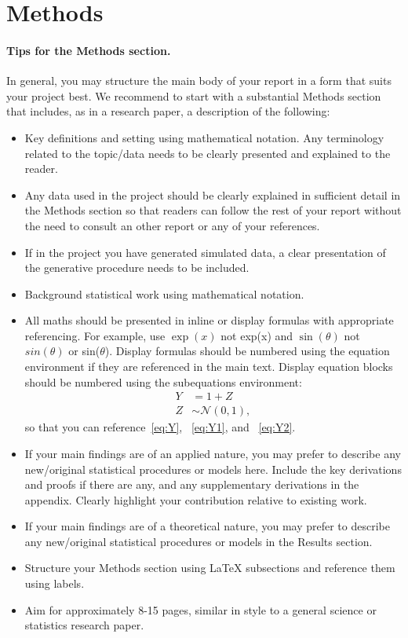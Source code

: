\section{Methods}\label{sec:methods}

\paragraph{Tips for the Methods section.} In general, you may structure the main body of your report in a form that suits your project best. We recommend to start with a substantial Methods section that includes, as in a research paper, a description of the following:
\begin{itemize}
    \item Key definitions and setting using mathematical notation. Any terminology related to the topic/data needs to be clearly presented and explained to the reader.
    \item Any data used in the project should be clearly explained in sufficient detail in the Methods section so that readers can follow the rest of your report without the need to consult an other report or any of your references.
    \item If in the project you have generated simulated data, a clear presentation of the generative procedure needs to be included. 
    \item Background statistical work using mathematical notation.
    \item All maths should be presented in inline or display formulas with appropriate referencing. For example, use $\exp(x)$ not exp(x) and $\sin(\theta)$ not $sin(\theta)$ or sin($\theta$). Display formulas should be numbered using the equation environment if they are referenced in the main text. Display equation blocks should be numbered using the subequations environment:
\begin{subequations}\label{eq:Y}
    \begin{align}
        Y & = 1 + Z \label{eq:Y1} \\ 
        Z & \sim \mathcal{N}(0,1) \label{eq:Y2},
    \end{align}
\end{subequations}
    so that you can reference~\eqref{eq:Y}, ~\eqref{eq:Y1}, and ~\eqref{eq:Y2}.
    \item If your main findings are of an applied nature, you may prefer to describe any new/original statistical procedures or models here. Include the key derivations and proofs if there are any, and any supplementary derivations in the appendix. Clearly highlight your contribution relative to existing work. 
    \item If your main findings are of a theoretical nature, you may prefer to describe any new/original statistical procedures or models in the Results section.
    \item Structure your Methods section using LaTeX   subsections and reference them using labels.
    \item Aim for approximately 8-15 pages, similar in style to a general science or statistics research paper.
\end{itemize}


